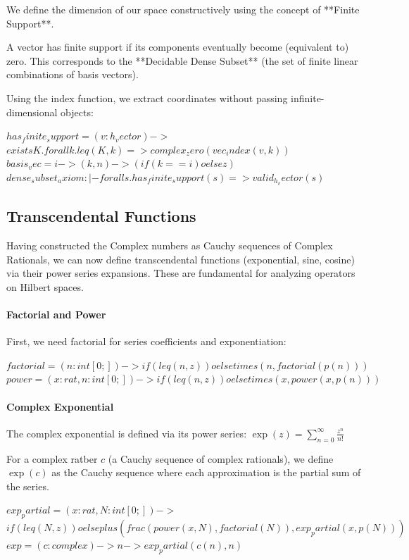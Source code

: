 \documentclass{stex}
\begin{document}
\begin{smodule}[id=Kopperman2]
{We define the dimension of our space constructively using the concept of **Finite Support**.

A vector has finite support if its components eventually become (equivalent to) zero. This corresponds to the **Decidable Dense Subset** (the set of finite linear combinations of basis vectors).

Using the index function, we extract coordinates without passing infinite-dimensional objects:

\uplinline$    has_finite_support = (v: h_vector) ->$ \\
\uplinline$      exists K. forall k. leq(K, k) => complex_zero(vec_index(v, k))$\\
\uplinline$    basis_vec = i -> (k, n) -> (if (k == i) o else z)$\\
\uplinline$    dense_subset_axiom : |- forall s. has_finite_support(s) => valid_h_vector(s)$

\subsection{Transcendental Functions}

Having constructed the Complex numbers as Cauchy sequences of Complex Rationals, we can now define transcendental functions (exponential, sine, cosine) via their power series expansions. These are fundamental for analyzing operators on Hilbert spaces.

\paragraph{Factorial and Power}
First, we need factorial for series coefficients and exponentiation:

\uplinline$    factorial = (n: int[0;]) -> if (leq(n, z)) o else times(n, factorial(p(n)))$
\uplinline$    power = (x: rat, n: int[0;]) -> if (leq(n, z)) o else times(x, power(x, p(n)))$

\paragraph{Complex Exponential}
The complex exponential is defined via its power series: $\exp(z) = \sum_{n=0}^{\infty} \frac{z^n}{n!}$

For a complex ratber $c$ (a Cauchy sequence of complex rationals), we define $\exp(c)$ as the Cauchy sequence where each approximation is the partial sum of the series.

\uplinline$    exp_partial = (x: rat, N: int[0;]) -> $\\
\uplinline$      if (leq(N, z)) o else plus(frac(power(x, N), factorial(N)), exp_partial(x, p(N)))$
\uplinline$    exp = (c: complex) -> n -> exp_partial(c(n), n)$

}
\end{smodule}
\end{document}
